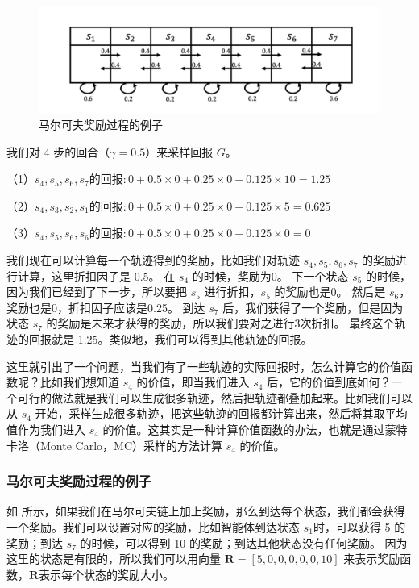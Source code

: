 \begin{figure}[hbt]
  \centering
  \includegraphics[width=0.7\linewidth]{ch2/figs/2.11.png}
  \caption{马尔可夫奖励过程的例子}
  \label{fig:fig2.11}
\end{figure}

我们对 4 步的回合（$\gamma=0.5$）来采样回报 $G$。

  （1）$s_{4}, s_{5}, s_{6}, s_{7} \text{的回报}: 0+0.5\times 0+0.25 \times 0+ 0.125\times 10=1.25$

  （2）$s_{4}, s_{3}, s_{2}, s_{1} \text{的回报}: 0+0.5 \times 0+0.25\times 0+0.125 \times 5=0.625$

  （3）$s_{4}, s_{5}, s_{6}, s_{6} \text{的回报}: 0+0.5\times 0 +0.25 \times 0+0.125 \times 0=0$

我们现在可以计算每一个轨迹得到的奖励，比如我们对轨迹 $s_4,s_5,s_6,s_7$ 的奖励进行计算，这里折扣因子是 0.5。
在 $s_4$ 的时候，奖励为0。
下一个状态 $s_5$ 的时候，因为我们已经到了下一步，所以要把 $s_5$ 进行折扣，$s_5$ 的奖励也是0。
然后是 $s_6$，奖励也是0，折扣因子应该是0.25。
到达 $s_7$ 后，我们获得了一个奖励，但是因为状态 $s_7$ 的奖励是未来才获得的奖励，所以我们要对之进行3次折扣。
最终这个轨迹的回报就是 1.25。类似地，我们可以得到其他轨迹的回报。

这里就引出了一个问题，当我们有了一些轨迹的实际回报时，怎么计算它的价值函数呢？比如我们想知道 $s_4$ 的价值，即当我们进入 $s_4$ 后，它的价值到底如何？一个可行的做法就是我们可以生成很多轨迹，然后把轨迹都叠加起来。比如我们可以从 $s_4$ 开始，采样生成很多轨迹，把这些轨迹的回报都计算出来，然后将其取平均值作为我们进入 $s_4$ 的价值。这其实是一种计算价值函数的办法，也就是通过蒙特卡洛（Monte Carlo，MC）采样的方法计算 $s_4$ 的价值。

\subsubsection{马尔可夫奖励过程的例子} 

如 所示，如果我们在马尔可夫链上加上奖励，那么到达每个状态，我们都会获得一个奖励。我们可以设置对应的奖励，比如智能体到达状态 $s_1$时，可以获得 5 的奖励；到达 $s_7$ 的时候，可以得到 10 的奖励；到达其他状态没有任何奖励。
因为这里的状态是有限的，所以我们可以用向量 $\boldsymbol{R}=[5,0,0,0,0,0,10]$ 来表示奖励函数，$\boldsymbol{R}$表示每个状态的奖励大小。

